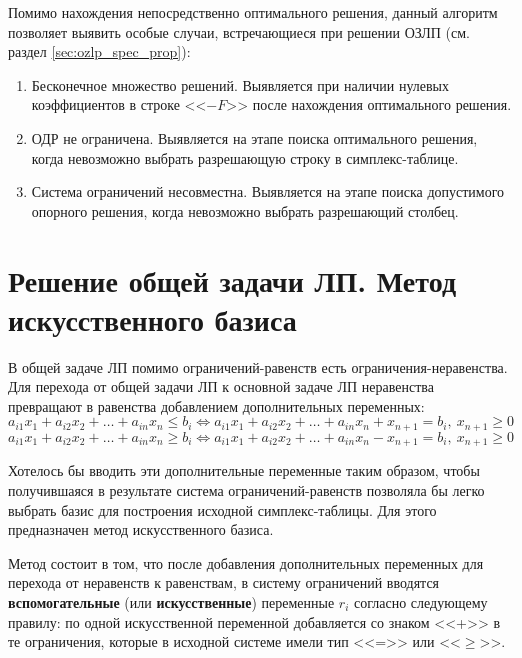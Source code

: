 \documentclass[a4paper,12pt]{report}
\begin{document}
Помимо нахождения непосредственно оптимального решения, данный алгоритм позволяет выявить особые случаи, встречающиеся при решении ОЗЛП (см. раздел \ref{sec:ozlp_spec_prop}):
\begin{enumerate}
\item Бесконечное множество решений. Выявляется при наличии нулевых коэффициентов в строке <<$-F$>> после нахождения оптимального решения.
\item ОДР не ограничена. Выявляется на этапе поиска оптимального решения, когда невозможно выбрать разрешающую строку в симплекс-таблице.
\item Система ограничений несовместна. Выявляется на этапе поиска допустимого опорного решения, когда невозможно выбрать разрешающий столбец.
\end{enumerate}

\section{Решение общей задачи ЛП. Метод искусственного базиса}
В общей задаче ЛП помимо ограничений-равенств есть ограничения-неравенства. Для перехода от общей задачи ЛП к основной задаче ЛП неравенства превращают в равенства добавлением дополнительных переменных:
\begin{equation*}
a_{i1}x_{1} + a_{i2}x_{2} + \ldots + a_{in}x_{n} \leq b_{i} \Leftrightarrow a_{i1}x_{1} + a_{i2}x_{2} + \ldots + a_{in}x_{n} + x_{n+1} = b_{i},\ x_{n+1} \geq 0
\end{equation*}
\begin{equation*}
a_{i1}x_{1} + a_{i2}x_{2} + \ldots + a_{in}x_{n} \geq b_{i} \Leftrightarrow a_{i1}x_{1} + a_{i2}x_{2} + \ldots + a_{in}x_{n} - x_{n+1} = b_{i},\ x_{n+1} \geq 0
\end{equation*}

Хотелось бы вводить эти дополнительные переменные таким образом, чтобы получившаяся в результате система ограничений-равенств позволяла бы легко выбрать базис для построения исходной симплекс-таблицы. Для этого предназначен метод искусственного базиса.

Метод состоит в том, что после добавления дополнительных переменных для перехода от неравенств к равенствам, в систему ограничений вводятся \textbf{вспомогательные} (или \textbf{искусственные}) переменные $r_{i}$ согласно следующему правилу: по одной искусственной переменной добавляется со знаком <<+>> в те ограничения, которые в исходной системе имели тип <<=>> или <<$\geq$>>.
\end{document}
